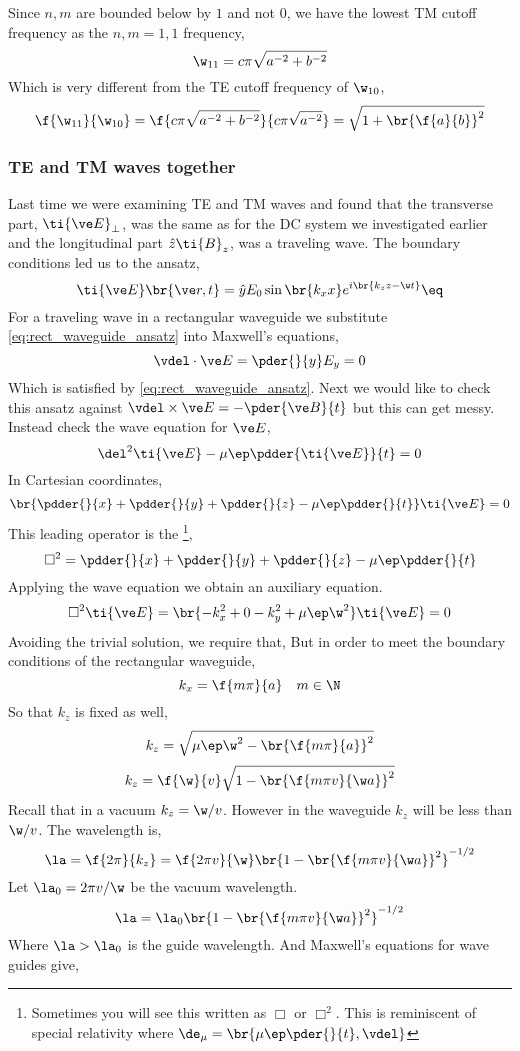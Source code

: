\documentclass{article}
\begin{document}
Since $n,m$ are bounded below by $1$ and not $0$, we have the lowest TM cutoff frequency as the $n, m = 1, 1$ frequency,
\[ \w_{11} = c \pi \sqrt{a^{-2} + b^{-2}} \]
Which is very different from the TE cutoff frequency of $\w_{10}$,
\[ \f{\w_{11}}{\w_{10}} = \f{c \pi \sqrt{a^{-2} + b^{-2}}}{c \pi \sqrt{a^{-2}}} = \sqrt{1 + \br{\f{a}{b}}^2} \]

\subsubsection{TE and TM waves together}
Last time we were examining TE and TM waves and found that the transverse part, $\ti{\ve E}_{\perp}$, was the same as for the DC system we investigated earlier and the longitudinal part $\hat z \ti{B}_z$, was a traveling wave. The boundary conditions led us to the ansatz,
\[ \ti{\ve E}\br{\ve r, t} = \hat y E_0 \sin\br{k_x x} e^{i\br{k_z z - \w t}} \eq \label{eq:rect_waveguide_ansatz}\]
For a traveling wave in a rectangular waveguide we substitute \cref{eq:rect_waveguide_ansatz} into Maxwell's equations,
\[ \vdel \cdot \ve E = \pder{}{y}E_y = 0 \]
Which is satisfied by \cref{eq:rect_waveguide_ansatz}. Next we would like to check this ansatz against $\vdel \times \ve E = - \pder{\ve B}{t}$ but this can get messy. Instead check the wave equation for $\ve E$,
\[ \del^2 \ti{\ve E} - \mu \ep \pdder{\ti{\ve E}}{t} = 0 \]
In Cartesian coordinates,
\[ \br{\pdder{}{x} + \pdder{}{y} + \pdder{}{z} - \mu \ep \pdder{}{t}}\ti{\ve E} = 0 \]
This leading operator is the \footnote{Sometimes you will see this written as $\Box$ or $\Box^2$. This is reminiscent of special relativity where $\de_\mu = \br{\mu \ep \pder{}{t}, \vdel}$},
\[ \Box^2 = \pdder{}{x} + \pdder{}{y} + \pdder{}{z} - \mu \ep \pdder{}{t} \]
Applying the wave equation we obtain an auxiliary equation.
\[ \Box^2 \ti{\ve E} = \br{- k_x^2 + 0 - k_y^2 + \mu \ep \w^2} \ti{\ve E} = 0 \]
Avoiding the trivial solution, we require that,
But in order to meet the boundary conditions of the rectangular waveguide,
\[ k_x = \f{m \pi}{a} \quad m \in \N \]
So that $k_z$ is fixed as well,
\[ k_z = \sqrt{\mu \ep \w^2 - \br{\f{m \pi}{a}}^2} \]
\[ k_z = \f{\w}{v}\sqrt{1 - \br{\f{m \pi v}{\w a}}^2} \]
Recall that in a vacuum $k_z = \w/ v$. However in the waveguide $k_z$ will be less than $\w / v$. The wavelength is,
\[ \la = \f{2 \pi}{k_z} = \f{2 \pi v}{\w}\br{1 - \br{\f{m \pi v}{\w a}}^2}^{-1/2} \]
Let $\la_0 = 2 \pi v/ \w$ be the vacuum wavelength.
\[ \la = \la_0\br{1 - \br{\f{m \pi v}{\w a}}^2}^{-1/2} \]
Where $\la > \la_0$ is the guide wavelength. And Maxwell's equations for wave guides give,
\end{document}
